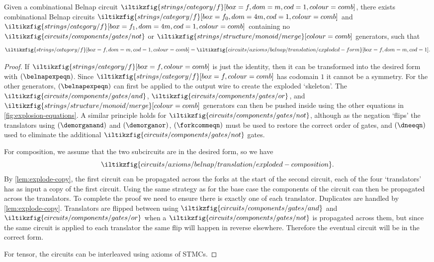 \begin{proposition}\label{prop:exploded-belnap}
    Given a combinational Belnap circuit \(
    \iltikzfig{strings/category/f}[box=f,dom=m,cod=1,colour=comb]
    \), there exists combinational Belnap circuits \(
    \iltikzfig{strings/category/f}[box=f_0,dom=4m,cod=1,colour=comb]
    \) and \(
    \iltikzfig{strings/category/f}[box=f_1,dom=4m,cod=1,colour=comb]
    \) containing no \(
    \iltikzfig{circuits/components/gates/not}
    \) or \(
    \iltikzfig{strings/structure/monoid/merge}[colour=comb]
    \) generators, such that \[
        \iltikzfig{strings/category/f}[box=f,dom=m,cod=1,colour=comb]
        =
        \iltikzfig{circuits/axioms/belnap/translation/exploded-form}[box=f,dom=m,cod=1].
    \]
\end{proposition}
\begin{proof}
    If \(\iltikzfig{strings/category/f}[box=f,colour=comb]\) is just
    the identity, then it can be transformed into the desired form with
    \((\belnapexpeqn)\).
    Since \(\iltikzfig{strings/category/f}[box=f,colour=comb]\) has codomain
    \(1\) it cannot be a symmetry.
    For the other generators, \((\belnapexpeqn)\) can first be applied
    to the output wire to create the exploded `skeleton'.
    The \(
    \iltikzfig{circuits/components/gates/and}
    \), \(
    \iltikzfig{circuits/components/gates/or}
    \), and \(
    \iltikzfig{strings/structure/monoid/merge}[colour=comb]
    \) generators can then be pushed inside using the other equations in
    \cref{fig:explosion-equations}.
    A similar principle holds for \(
    \iltikzfig{circuits/components/gates/not}
    \), although as the negation `flips' the translators using
    \((\demorganand)\) and \((\demorganor)\), \((\forkcommeqn)\) must be used to
    restore the correct order of gates, and \((\dneeqn)\) used to eliminate the
    additional \(\iltikzfig{circuits/components/gates/not}\) gates.

    For composition, we assume that the two subcircuits are in the desired form,
    so we have \[
        \iltikzfig{circuits/axioms/belnap/translation/exploded-composition}.
    \]
    By \cref{lem:explode-copy}, the first circuit can be propagated across
    the forks at the start of the second circuit, each of the four
    `translators' has as input a copy of the first circuit.
    Using the same strategy as for the base case the components of the circuit
    can then be propagated across the translators.
    To complete the proof we need to ensure there is exactly one of each
    translator.
    Duplicates are handled by \cref{lem:explode-copy}.
    Translators are flipped between using \(
    \iltikzfig{circuits/components/gates/and}
    \) and \(
    \iltikzfig{circuits/components/gates/or}
    \) when a \(\iltikzfig{circuits/components/gates/not}\) is propagated across
    them, but since the same circuit is applied to each translator the same
    flip will happen in reverse elsewhere.
    Therefore the eventual circuit will be in the correct form.

    For tensor, the circuits can be interleaved using axioms of STMCs.
\end{proof}


